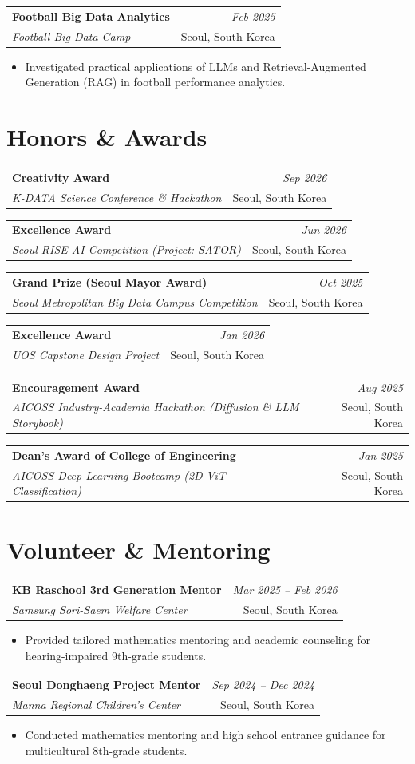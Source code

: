 \documentclass[a4paper,10pt]{article}
\makeatletter
\newcommand{\cvheading}[4]{
  \vspace{0.5mm}
  \begin{tabularx}{\textwidth}{@{}X r@{}}
    \textbf{#1} & \textit{\footnotesize #4} \\
    \textit{\small #2} & \footnotesize\color{subtext}#3 \\
  \end{tabularx}
  \vspace{-1.5mm}
}
\newcommand{\cvitemstart}{\begin{itemize}[leftmargin=3.5mm, itemsep=0.6mm, topsep=0.8mm]}
\newcommand{\cvitemend}{\end{itemize}\vspace{1.2mm}}
\makeatother
\begin{document}
\cvheading{Football Big Data Analytics}{Football Big Data Camp}{Seoul, South Korea}{Feb 2025}
\cvitemstart
    \item Investigated practical applications of LLMs and Retrieval-Augmented Generation (RAG) in football performance analytics.
\cvitemend

\section{Honors \& Awards}
\cvheading{Creativity Award}{K-DATA Science Conference \& Hackathon}{Seoul, South Korea}{Sep 2026}
\cvheading{Excellence Award}{Seoul RISE AI Competition (Project: SATOR)}{Seoul, South Korea}{Jun 2026}
\cvheading{Grand Prize (Seoul Mayor Award)}{Seoul Metropolitan Big Data Campus Competition}{Seoul, South Korea}{Oct 2025}
\cvheading{Excellence Award}{UOS Capstone Design Project}{Seoul, South Korea}{Jan 2026}
\cvheading{Encouragement Award}{AICOSS Industry-Academia Hackathon (Diffusion \& LLM Storybook)}{Seoul, South Korea}{Aug 2025}
\cvheading{Dean's Award of College of Engineering}{AICOSS Deep Learning Bootcamp (2D ViT Classification)}{Seoul, South Korea}{Jan 2025}

\section{Volunteer \& Mentoring}

\cvheading{KB Raschool 3rd Generation Mentor}{Samsung Sori-Saem Welfare Center}{Seoul, South Korea}{Mar 2025 -- Feb 2026}
\cvitemstart
    \item Provided tailored mathematics mentoring and academic counseling for hearing-impaired 9th-grade students.
\cvitemend

\cvheading{Seoul Donghaeng Project Mentor}{Manna Regional Children's Center}{Seoul, South Korea}{Sep 2024 -- Dec 2024}
\cvitemstart
    \item Conducted mathematics mentoring and high school entrance guidance for multicultural 8th-grade students.
\cvitemend

\end{document}
